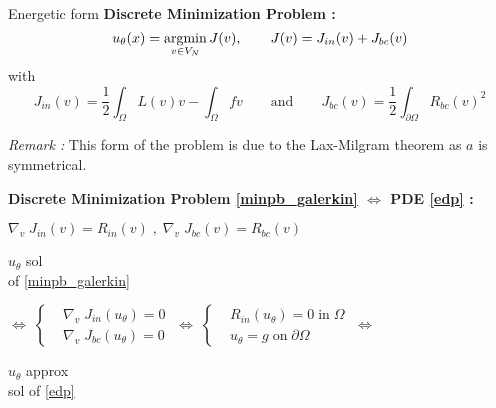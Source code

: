 \begin{frame}{Energetic form}
	\textbf{Discrete Minimization Problem :}
	\begin{equation}
		\displaystyle u_\theta(x)=\operatorname*{argmin}_{v\in V_N} J(v), \qquad J(v)=J_{in}(v)+J_{bc}(v)\label{minpb_galerkin}
	\end{equation}
	with 
	\begin{equation*}
		J_{in}(v)=\frac{1}{2}\int_\Omega L(v)v - \int_\Omega fv  \qquad \text{and} \qquad J_{bc}(v)=\frac{1}{2}\int_{\partial\Omega} R_{bc}(v)^2
	\end{equation*}

	\footnotesize	
	\textit{Remark :} This form of the problem is due to the Lax-Milgram theorem as $a$ is symmetrical.
	\normalsize
	
	\footnotesize
	\begin{center}
		\begin{tcolorbox}[
			colback=white, %
			colframe=other, %
			arc=2mm, %
			boxrule=0.5pt, %
			breakable, enhanced jigsaw,
			width=0.85\linewidth
			]
			
			\textbf{Discrete Minimization Problem \eqref{minpb_galerkin} $\Leftrightarrow$ PDE \eqref{edp} :}
			
			\centering
			$\nabla_v \; J_{in}(v)=R_{in}(v) \; , \; \nabla_v \; J_{bc}(v)=R_{bc}(v) \qquad $  
			
			\vspace{5pt}
			
			\begin{minipage}{0.1\linewidth}
				\centering
				$u_\theta$ sol \\
				of \eqref{minpb_galerkin}
			\end{minipage} $\Leftrightarrow \; \left\{\begin{aligned}
				&\nabla_v \; J_{in}(u_\theta)=0 \\
				&\nabla_v \; J_{bc}(u_\theta)=0
			\end{aligned}\right. \; \Leftrightarrow \; \left\{\begin{aligned}
				&R_{in}(u_\theta)=0 \; \text{in} \; \Omega \\
				&u_\theta=g \; \text{on} \; \partial\Omega
			\end{aligned}\right. \; \Leftrightarrow$ \begin{minipage}{0.15\linewidth}
				\centering
				$u_\theta$ approx \\
				sol of \eqref{edp}
			\end{minipage}
		

\end{tcolorbox}
\end{center}
\end{frame}
